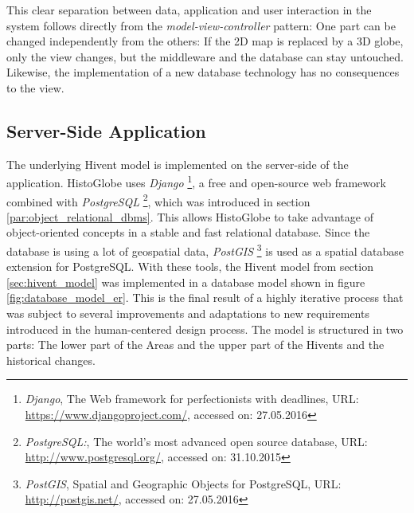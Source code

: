 This clear separation between data, application and user interaction in the system follows directly from the \emph{model-view-controller} pattern: One part can be changed independently from the others: If the 2D map is replaced by a 3D globe, only the view changes, but the middleware and the database can stay untouched. Likewise, the implementation of a new database technology has no consequences to the view.


\subsection{Server-Side Application} %
\label{sub:server_side_application}

The underlying Hivent model is implemented on the server-side of the application. HistoGlobe uses \emph{Django}
\footnote{
  \emph{Django},
  The Web framework for perfectionists with deadlines,
  URL: \url{https://www.djangoproject.com/},
  accessed on: 27.05.2016
},
a free and open-source web framework combined with \emph{PostgreSQL}
\footnote{
  \emph{PostgreSQL:},
  The world's most advanced open source database,
  URL: \url{http://www.postgresql.org/},
  accessed on: 31.10.2015
},
which was introduced in section \ref{par:object_relational_dbms}. This allows HistoGlobe to take advantage of object-oriented concepts in a stable and fast relational database. Since the database is using a lot of geospatial data, \emph{PostGIS}
\footnote{
  \emph{PostGIS},
  Spatial and Geographic Objects for PostgreSQL,
  URL: \url{http://postgis.net/},
  accessed on: 27.05.2016
}
is used as a spatial database extension for PostgreSQL. With these tools, the Hivent model from section \ref{sec:hivent_model}  was implemented in a database model shown in figure \ref{fig:database_model_er}. This is the final result of a highly iterative process that was subject to several improvements and adaptations to new requirements introduced in the human-centered design process. The model is structured in two parts: The lower part of the Areas and the upper part of the Hivents and the historical changes.

